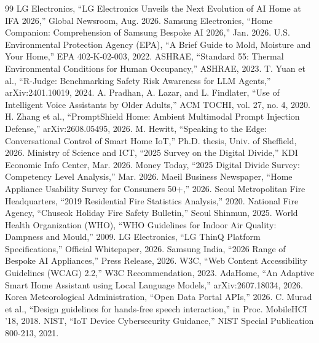 \documentclass[conference]{IEEEtran}
\begin{document}
\begin{thebibliography}{99}
\footnotesize
{} LG Electronics, ``LG Electronics Unveils the Next Evolution of AI Home at IFA 2026,'' Global Newsroom, Aug. 2026.
 Samsung Electronics, ``Home Companion: Comprehension of Samsung Bespoke AI 2026,'' Jan. 2026.
 U.S. Environmental Protection Agency (EPA), ``A Brief Guide to Mold, Moisture and Your Home,'' EPA 402-K-02-003, 2022.
 ASHRAE, ``Standard 55: Thermal Environmental Conditions for Human Occupancy,'' ASHRAE, 2023.
 T. Yuan et al., ``R-Judge: Benchmarking Safety Risk Awareness for LLM Agents,'' arXiv:2401.10019, 2024.
 A. Pradhan, A. Lazar, and L. Findlater, ``Use of Intelligent Voice Assistants by Older Adults,'' ACM TOCHI, vol. 27, no. 4, 2020.
 H. Zhang et al., ``PromptShield Home: Ambient Multimodal Prompt Injection Defense,'' arXiv:2608.05495, 2026.
 M. Hewitt, ``Speaking to the Edge: Conversational Control of Smart Home IoT,'' Ph.D. thesis, Univ. of Sheffield, 2026.
 Ministry of Science and ICT, ``2025 Survey on the Digital Divide,'' KDI Economic Info Center, Mar. 2026.
 Money Today, ``2025 Digital Divide Survey: Competency Level Analysis,'' Mar. 2026.
 Maeil Business Newspaper, ``Home Appliance Usability Survey for Consumers 50+,'' 2026.
 Seoul Metropolitan Fire Headquarters, ``2019 Residential Fire Statistics Analysis,'' 2020.
 National Fire Agency, ``Chuseok Holiday Fire Safety Bulletin,'' Seoul Shinmun, 2025.
 World Health Organization (WHO), ``WHO Guidelines for Indoor Air Quality: Dampness and Mould,'' 2009.
 LG Electronics, ``LG ThinQ Platform Specifications,'' Official Whitepaper, 2026.
 Samsung India, ``2026 Range of Bespoke AI Appliances,'' Press Release, 2026.
 W3C, ``Web Content Accessibility Guidelines (WCAG) 2.2,'' W3C Recommendation, 2023.
 AdaHome, ``An Adaptive Smart Home Assistant using Local Language Models,'' arXiv:2607.18034, 2026.
 Korea Meteorological Administration, ``Open Data Portal APIs,'' 2026.
 C. Murad et al., ``Design guidelines for hands-free speech interaction,'' in Proc. MobileHCI '18, 2018.
 NIST, ``IoT Device Cybersecurity Guidance,'' NIST Special Publication 800-213, 2021.
\end{thebibliography}
\end{document}
